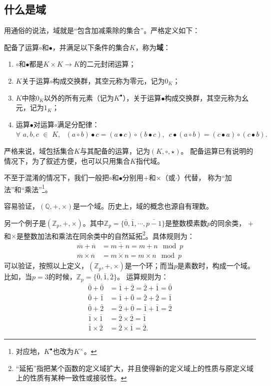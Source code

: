 \documentclass[12pt,UTF8]{ctexbook}
\begin{document}
\begin{appendix}
\subsection{什么是域}
用通俗的说法，域就是“包含加减乘除的集合”。严格定义如下：
\begin{df}\label{df:9_1}
    配备了运算$\circ$和$\bullet$，并满足以下条件的集合$K$，称为\textbf{域}：
    \begin{enumerate}
        \item $\circ$和$\bullet$都是$K \times K \rightarrow K$的二元封闭运算；
        \item $K$关于运算$\circ$构成交换群，其空元称为零元，记为$0_{K}$；
        \item $K$中除$0_{K}$以外的所有元素（记为$K^\bullet$），关于运算$\bullet$构成交换群，其空元称为幺元，记为$1_{K}$；
        \item 运算$\bullet$对运算$\circ$满足分配律：$\forall \,\, a, b, c \,\, \in \,\, K, \,\,\,\, (a \circ b) \bullet c = (a \bullet c) \circ (b \bullet c), \,\,\, c\bullet (a \circ b) = (c \bullet a) \circ (c \bullet b).$
    \end{enumerate}
    严格来说，域包括集合$K$与其配备的运算，记为$(K, \circ, \star)$。
    配备运算已有说明的情况下，为了叙述方便，也可以只用集合$K$指代域。
\end{df}
不至于混淆的情况下，我们一般把$\circ$和$\bullet$分别用$+$和$\times$（或$\cdot$）代替，
称为“加法”和“乘法”\footnote{对应地，$K^\bullet$也改为$K^\times$。}。

容易验证，$(\mathbb{Q}, +, \times)$是一个域。历史上，域的概念也源自有理数。

另一个例子是$(\mathbb{Z}_p, +, \times)$。其中$\mathbb{Z}_p = \{\bar{0}, \bar{1}, \cdots , \overline{p-1}\}$是整数模素数$p$的同余类，
$+$和$\times$是整数加法和乘法在同余类中的自然延拓\footnote{“延拓”指把某个函数的定义域扩大，并且使得新的定义域上的性质与原定义域上的性质有某种一致性或接驳性。}。具体规则为：
\begin{align*}
    \overline{m} + \overline{n} &= \overline{m+n} = m+n \mod{p}  \\
    \overline{m} \times \overline{n} &= \overline{m\times n} = m\times n \mod{p} 
\end{align*}
可以验证，按照以上定义，$(\mathbb{Z}_p, +, \times)$是一个环；而当$p$是素数时，构成一个域。
比如，当$p = 3$的时候，$\mathbb{Z}_p = \{\bar{0}, \bar{1}, \bar{2}\}$。
运算规则为：
\begin{align*}
    \bar{0} + \bar{0} &= \bar{1} + \bar{2} = \bar{2} + \bar{1}= \bar{0}  \\
    \bar{0} + \bar{1} &= \bar{1} + \bar{0} = \bar{2} + \bar{2}= \bar{1}  \\
    \bar{0} + \bar{2} &= \bar{2} + \bar{0} = \bar{1} + \bar{1}= \bar{2}  \\
    \bar{1} \times \bar{1} &= \bar{2} \times \bar{2} = \bar{1}  \\
    \bar{1} \times \bar{2} &= \bar{2} \times \bar{1} = \bar{2}.  
\end{align*}


\end{appendix}
\end{document}
